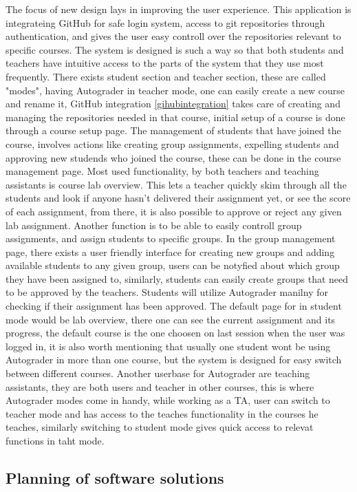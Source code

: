 The focus of new design lays in improving the user experience. This application is integrateing GitHub for safe login system, access to git repositories through authentication, and gives the user easy controll over the repositories relevant to specific courses. The system is designed is such a way so that both students and teachers have intuitive access to the parts of the system that they use most frequently. There exists student section and teacher section, these are called "modes", having Autograder in teacher mode, one can easily create a new course and rename it, GitHub integration \ref{gihubintegration} takes care of creating and managing the repositories needed in that course, initial setup of a course is done through a course setup page. The management of students that have joined the course, involves actions like creating group assignments, expelling students and approving new studends who joined the course, these can be done in the course management page. Most used functionality, by both teachers and teaching assistants is course lab overview. This lets a teacher quickly skim through all the students and look if anyone hasn't delivered their assignment yet, or see the score of each assignment, from there, it is also possible to approve or reject any given lab assignment. Another function is to be able to easily controll group assignments, and assign students to specific groups. In the group management page, there exists a user friendly interface for creating new groups and adding available students to any given group, users can be notyfied about which group they have been assigned to, similarly, students can easily create groups that need to be approved by the teachers. Students will utilize Autograder manilny for checking if their assignment has been approved. The default page for in student mode would be lab overview, there one can see the current assignment and its progress, the default course is the one choosen on last session when the user was logged in, it is also worth mentioning that usually one student wont be using Autograder in more than one course, but the system is designed for easy switch between different courses. Another userbase for Autograder are teaching assistants, they are both users and teacher in other courses, this is where Autograder modes come in handy, while working as a TA, user can switch to teacher mode and has access to the teaches functionality in the courses he teaches, similarly switching to student mode gives quick access to relevat functions in taht mode.
\subsection{Planning of software solutions}
\todo{}
